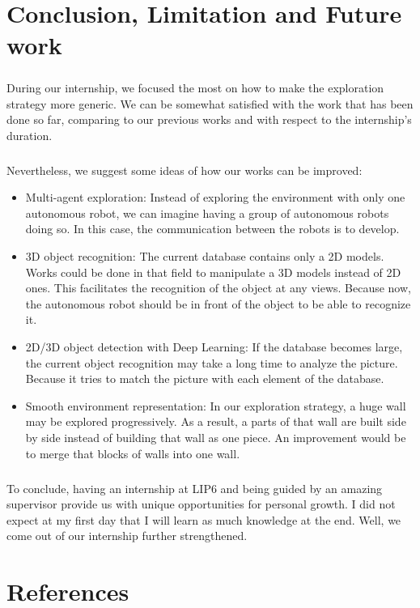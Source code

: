 \documentclass[12pt]{report}
\begin{document}
	\chapter{Conclusion, Limitation and Future work}
	\paragraph{}
	During our internship, we focused the most on how to make the exploration strategy more generic. We can be somewhat satisfied with the work that has been done so far, comparing to our previous works and with respect to the internship's duration.

	\paragraph{}
	Nevertheless, we suggest some ideas of how our works can be improved:
	\begin{itemize}
		\item Multi-agent exploration: Instead of exploring the environment with only one autonomous robot, we can imagine having a group of autonomous robots doing so. In this case, the communication between the robots is to develop.
		\item 3D object recognition: The current database contains only a 2D models. Works could be done in that field to manipulate a 3D models instead of 2D ones. This facilitates the recognition of the object at any views. Because now, the autonomous robot should be in front of the object to be able to recognize it.
		\item 2D/3D object detection with Deep Learning: If the database becomes large, the current object recognition may take a long time to analyze the picture. Because it tries to match the picture with each element of the database.
		\item Smooth environment representation: In our exploration strategy, a huge wall may be explored progressively. As a result, a parts of that wall are built side by side instead of building that wall as one piece. An improvement would be to merge that blocks of walls into one wall.
		
	\end{itemize}
\paragraph{}
To conclude, having an internship at LIP6 and being guided by an amazing supervisor provide us with unique opportunities for personal growth. I did not expect at my first day that I will learn as much knowledge at the end. Well, we come out of our internship further strengthened. 
	\chapter{References}
	\nocite{*}
    \printbibliography
\end{document}
